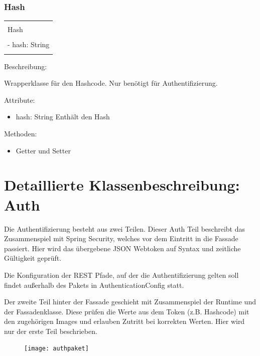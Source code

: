 \documentclass[a4paper,20pt,oneside]{book}
\begin{document}
	
	\subsubsection{Hash}
		\centering
	\begin{tabular}{|l|}
	\hline \\
	Hash\\
	\hline \\
	- hash: String\\
    \hline \\
	\hline 
	\end{tabular}
	
	
	\vspace{0.5cm}
	\raggedright
	
	Beschreibung:	
	
	Wrapperklasse für den Hashcode. Nur benötigt für Authentifizierung.
	
	\vspace{0.5cm}
	Attribute:
	\begin{itemize}
	\item hash: String\linebreak	
	Enthält den Hash
	\end{itemize}
	
	Methoden:
	\begin{itemize}
	\item Getter und Setter
	\end{itemize}
	
	
	\newpage
	\section{Detaillierte Klassenbeschreibung: Auth}
	\raggedright
		Die Authentifizierung besteht aus zwei Teilen. Dieser Auth Teil beschreibt das Zusammenspiel mit Spring Security, welches vor dem Eintritt in die Fassade passiert. Hier wird das übergebene JSON Webtoken auf Syntax und zeitliche Gültigkeit geprüft. 
		
		Die Konfiguration der REST Pfade, auf der die Authentifizierung gelten soll findet außerhalb des Pakets in AuthenticationConfig statt. 

		Der zweite Teil hinter der Fassade geschieht mit Zusammenspiel der Runtime und der Fassadenklasse. Diese prüfen die Werte aus dem Token (z.B. Hashcode) mit den zugehörigen Images und erlauben Zutritt bei korrekten Werten. Hier wird nur der erste Teil beschrieben.
		
	\begin{figure}[!hb]
    \texttt{[image: authpaket]}
	\end{figure}
\end{document}
